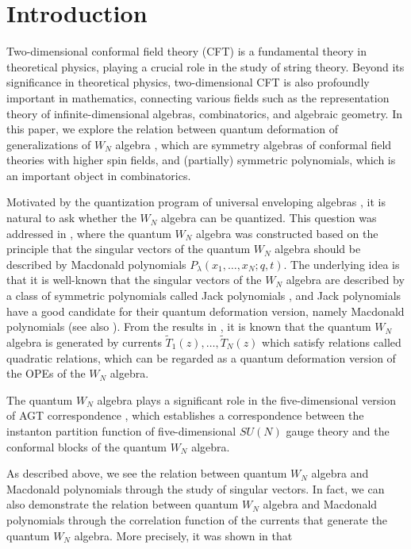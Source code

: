 \documentclass[12pt,reqno,a4paper]{amsart}
\numberwithin{equation}{section}
\theoremstyle{definition}
\begin{document}
\section{Introduction}
\label{intro}

Two-dimensional conformal field theory (CFT) is a fundamental theory in theoretical physics, playing a crucial role in the study of string theory. Beyond its significance in theoretical physics, two-dimensional CFT is also profoundly important in mathematics, connecting various fields such as the representation theory of infinite-dimensional algebras, combinatorics, and algebraic geometry. In this paper, we explore the relation between quantum deformation of generalizations of $W_N$ algebra \cite{BPZ}  \cite{BS1993} \cite{Zamo}, which are symmetry algebras of conformal field theories with higher spin fields, and (partially) symmetric polynomials, which is an important object in combinatorics. 



Motivated by the quantization program of universal enveloping algebras \cite{DR} \cite{Jim-original}, it is natural to ask whether the $W_N$ algebra can be quantized. This question was addressed in \cite{AKOS-950} \cite{SKAO95}, where the quantum $W_N$ algebra was constructed based on the principle that the singular vectors of the quantum $W_N$ algebra should be described by Macdonald polynomials $P_\lambda(x_1,\dots,x_N ; q,t)$. The underlying idea is that it is well-known that the singular vectors of the $W_N$ algebra are described by a class of symmetric polynomials called Jack polynomials \cite{awata-excited} \cite{mimachi-yamada-1995-singular}, and Jack polynomials have a good candidate for their quantum deformation version, namely Macdonald polynomials \cite{macbook-1998} (see also \cite{noumi-mac}). From the results in \cite{AKOS-950} \cite{SKAO95}, it is known that the quantum $W_N$ algebra is generated by currents $\widetilde{T}_1(z), \dots,\widetilde{T}_N(z)$ which satisfy relations called quadratic relations, which can be regarded as a quantum deformation version of the OPEs of the $W_N$ algebra. 

The quantum $W_N$ algebra plays a significant role in the five-dimensional version \cite{AY} \cite{AY2} \cite{Taki} of AGT correspondence \cite{AGT} \cite{Wyl}, which establishes a correspondence between the instanton partition function \cite{nekrasov} of five-dimensional $SU(N)$ gauge theory and the conformal blocks of the quantum $W_N$ algebra. 

As described above, we see the relation between quantum $W_N$ algebra and Macdonald polynomials through the study of singular vectors. In fact, we can also demonstrate the relation between quantum $W_N$ algebra and Macdonald polynomials through the correlation function of the currents that generate the quantum $W_N$ algebra. More precisely, it was shown in \cite{FHSSY-ker} that 
\end{document}
